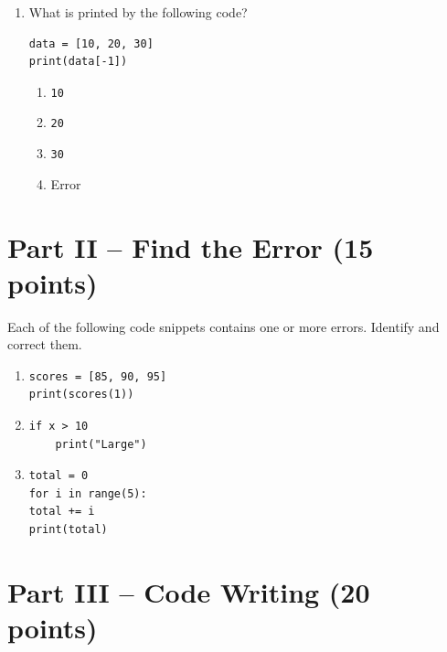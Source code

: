 \documentclass[12pt]{article}
\begin{document}
\begin{enumerate}[label=\arabic*.]
\newpage

    \item What is printed by the following code?
\begin{lstlisting}
data = [10, 20, 30]
print(data[-1])
\end{lstlisting}
    \begin{enumerate}[label=\Alph*.]
        \item \texttt{10}
        \item \texttt{20}
        \item \texttt{30}
        \item Error
    \end{enumerate}
\end{enumerate}

\section*{Part II -- Find the Error (15 points)}

Each of the following code snippets contains one or more errors. Identify and correct them.

\begin{enumerate}[resume,label=\arabic*.]
    \item
\begin{lstlisting}
scores = [85, 90, 95]
print(scores(1))
\end{lstlisting}

    \vspace{2.5cm}

    \item
\begin{lstlisting}
if x > 10
    print("Large")
\end{lstlisting}

    \vspace{2.5cm}

    \item
\begin{lstlisting}
total = 0
for i in range(5):
total += i
print(total)
\end{lstlisting}

    \vspace{2.5cm}
\end{enumerate}

\newpage

\section*{Part III -- Code Writing (20 points)}
\end{document}

